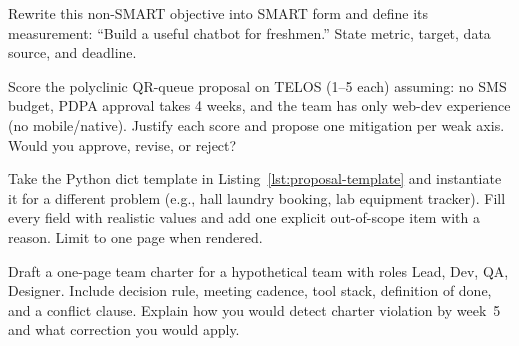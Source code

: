 \begin{exercise}
Rewrite this non-SMART objective into SMART form and define its measurement: ``Build a useful chatbot for freshmen.'' State metric, target, data source, and deadline.
\end{exercise}

\begin{exercise}
Score the polyclinic QR-queue proposal on TELOS (1--5 each) assuming: no SMS budget, PDPA approval takes 4 weeks, and the team has only web-dev experience (no mobile/native). Justify each score and propose one mitigation per weak axis. Would you approve, revise, or reject?
\end{exercise}

\begin{exercise}
Take the Python dict template in Listing~\ref{lst:proposal-template} and instantiate it for a different problem (e.g., hall laundry booking, lab equipment tracker). Fill every field with realistic values and add one explicit out-of-scope item with a reason. Limit to one page when rendered.
\end{exercise}

\begin{exercise}
Draft a one-page team charter for a hypothetical team with roles Lead, Dev, QA, Designer. Include decision rule, meeting cadence, tool stack, definition of done, and a conflict clause. Explain how you would detect charter violation by week~5 and what correction you would apply.
\end{exercise}

